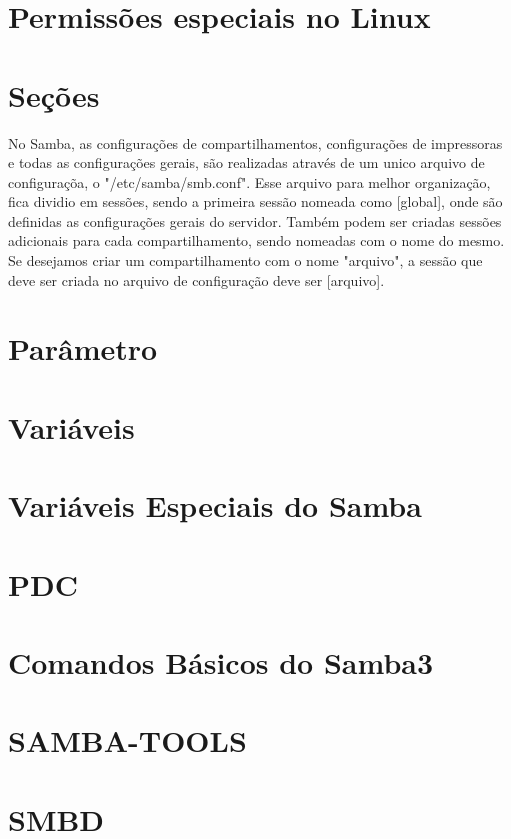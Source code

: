 \section{Permissões especiais no Linux}

\section{Seções}

No Samba, as configurações de compartilhamentos, configurações de impressoras e todas as configurações gerais, são realizadas através de um unico arquivo de configuraçõa, o "/etc/samba/smb.conf". Esse arquivo para melhor organização, fica dividio em sessões, sendo a primeira sessão nomeada como [global], onde são definidas as configurações gerais do servidor. Também podem ser criadas sessões adicionais para cada compartilhamento, sendo nomeadas com o nome do mesmo. Se desejamos criar um compartilhamento com o nome "arquivo", a sessão que deve ser criada no arquivo de configuração deve ser [arquivo].

\section{Parâmetro}

\section{Variáveis}

\section{Variáveis Especiais do Samba}

\section{PDC}

\section{Comandos Básicos do Samba3}

\section{SAMBA-TOOLS}

\section{SMBD}

